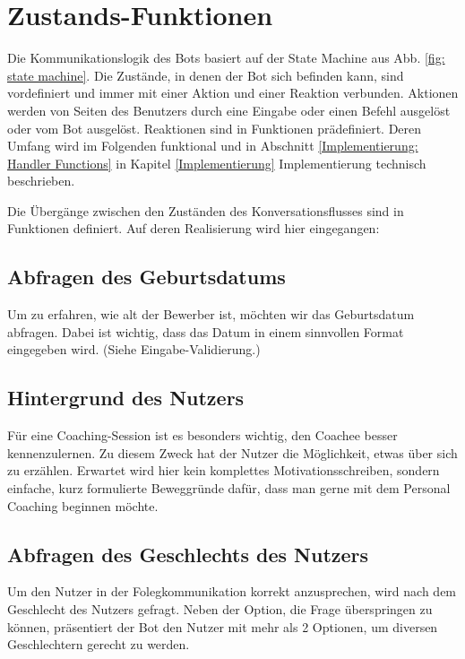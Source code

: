             
    \section{Zustands-Funktionen} \label{Realisierung: state functions}
        Die Kommunikationslogik des Bots basiert auf der State Machine aus Abb. \ref*{fig: state machine}. Die Zustände, in denen der Bot sich befinden kann, sind vordefiniert und immer mit einer Aktion und einer Reaktion verbunden. Aktionen werden von Seiten des Benutzers durch eine Eingabe oder einen Befehl ausgelöst oder vom Bot ausgelöst. Reaktionen sind in Funktionen prädefiniert. Deren Umfang wird im Folgenden funktional und in Abschnitt \ref*{Implementierung: Handler Functions} in Kapitel \ref{Implementierung} Implementierung technisch beschrieben.
            
        Die Übergänge zwischen den Zuständen des Konversationsflusses sind in Funktionen definiert. Auf deren Realisierung wird hier eingegangen:
        
        \subsection{Abfragen des Geburtsdatums}    
        Um zu erfahren, wie alt der Bewerber ist, möchten wir das Geburtsdatum abfragen. Dabei ist wichtig, dass das Datum in einem sinnvollen Format eingegeben wird. (Siehe Eingabe-Validierung.)
        
        \subsection{Hintergrund des Nutzers}
        Für eine Coaching-Session ist es besonders wichtig, den Coachee besser kennenzulernen. Zu diesem Zweck hat der Nutzer die Möglichkeit, etwas über sich zu erzählen. Erwartet wird hier kein komplettes Motivationsschreiben, sondern einfache, kurz formulierte Beweggründe dafür, dass man gerne mit dem Personal Coaching beginnen möchte. 
        
        \subsection{Abfragen des Geschlechts des Nutzers}
        Um den Nutzer in der Folegkommunikation korrekt anzusprechen, wird nach dem Geschlecht des Nutzers gefragt. Neben der Option, die Frage überspringen zu können, präsentiert der Bot den Nutzer mit mehr als 2 Optionen, um diversen Geschlechtern gerecht zu werden.
        
